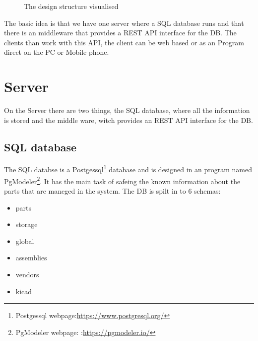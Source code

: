 \begin{figure}[h]
{%
	}
	\caption{The design structure visualised}
\end{figure}
The basic idea is that we have one server where a SQL database runs and that there is an middleware that provides a REST API interface for the DB. The clients than work with this API, the client can be web based or as an Program direct on the PC or Mobile phone.

\newpage
\section{Server}
On the Server there are two things, the SQL database, where all the information is stored and the middle ware, witch provides an REST API interface for the DB.

\subsection{SQL database}
The SQL databse is a Postgessql\footnote{Postgessql webpage:{\url{https://www.postgresql.org/}}} database and is designed in an program named PgModeler\footnote{PgModeler webpage: :{\url{https://pgmodeler.io/}}}. It has the main task of safeing the known information about the parts that are maneged in the system.
\newline\newline
The DB is spilt in to 6 schemas:
\begin{itemize}
	\item parts
	\item storage
	\item global
	\item assemblies
	\item vendors
	\item kicad
\end{itemize}

